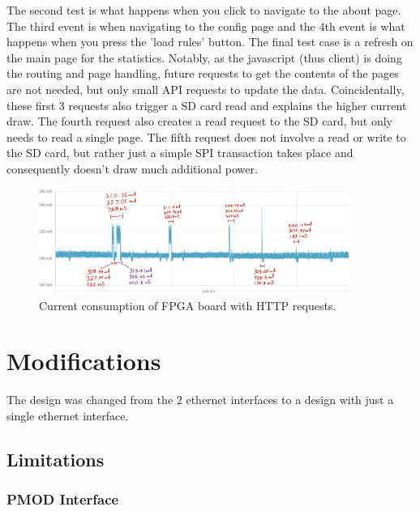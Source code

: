 The second test is what happens when you click to navigate to the about page. The third event is when navigating to the config page and the 4th event is what happens when you press the 'load rules' button. The final test case is a refresh on the main page for the statistics. Notably, as the javascript (thus client) is doing the routing and page handling, future requests to get the contents of the pages are not needed, but only small API requests to update the data. Coincidentally, these first 3 requests also trigger a SD card read and explains the higher current draw. The fourth request also creates a read request to the SD card, but only needs to read a single page. The fifth request does not involve a read or write to the SD card, but rather just a simple SPI transaction takes place and consequently doesn't draw much additional power. 

\begin{figure}[h]
    \centering
    \includegraphics[width=0.9\textwidth]{Images/PPK_http_annotated.png}
    \caption[Current consumption of FPGA board with HTTP requests]{Current consumption of FPGA board with HTTP requests.}
    \label{fig:ppk_http_annotated}
\end{figure}













\section{Modifications}
The design was changed from the 2 ethernet interfaces to a design with just a single ethernet interface. 
\subsection{Limitations}
\subsubsection{PMOD Interface}

